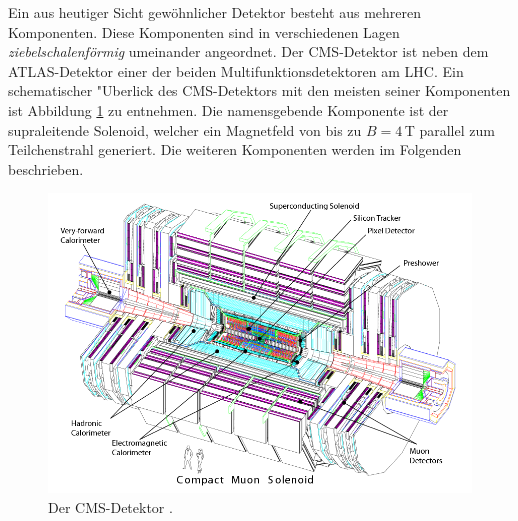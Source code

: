 Ein aus heutiger Sicht gew\"ohnlicher Detektor besteht aus mehreren Komponenten. Diese Komponenten sind in verschiedenen Lagen \textit{ziebelschalenf\"ormig} umeinander angeordnet.
Der CMS-Detektor ist neben dem ATLAS-Detektor einer der beiden Multifunktionsdetektoren am LHC. Ein schematischer "Uberlick des CMS-Detektors mit den meisten seiner Komponenten ist
Abbildung \ref{cmsdetektor} zu entnehmen. Die namensgebende Komponente ist der supraleitende Solenoid, welcher ein Magnetfeld von bis zu $B=4$\,T parallel zum Teilchenstrahl generiert.
Die weiteren Komponenten werden im Folgenden beschrieben.\\

	\begin{figure}[t]
		\centering
		\includegraphics[scale=0.50]{LHC/cms_complete}
		\caption[Der CMS-Detektor]{Der CMS-Detektor \cite{Chatrchyan:2008aa}.}
		\label{cmsdetektor}
	\end{figure}


